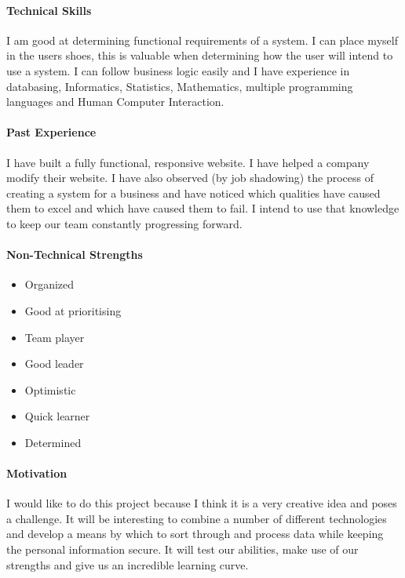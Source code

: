 \documentclass[english]{article}
\begin{document}
			\paragraph{Technical Skills}
			I am good at determining functional requirements of a system. I can place myself in the users shoes, this is valuable when determining how the user will intend to use a system. I can follow business logic easily and I have experience in databasing, Informatics, Statistics, Mathematics, multiple programming languages and Human Computer Interaction.
			
			\paragraph{Past Experience}
			I have built a fully functional, responsive website. I have helped a company modify their website. I have also observed (by job shadowing) the process of creating a system for a business and have noticed which qualities have caused them to excel and which have caused them to fail. I intend to use that knowledge to keep our team constantly progressing forward.
			
			\paragraph{Non-Technical Strengths}
			\begin{itemize}
				\setlength\itemsep{0.2em}
			        \item Organized
			        \item Good at prioritising 
			        \item Team player
			        \item Good leader
			        \item Optimistic
			        \item Quick learner
			        \item Determined
			\end{itemize}
			
			\paragraph{Motivation}
			I would like to do this project because I think it is a very creative idea and poses a challenge. It will be interesting to combine a number of different technologies and develop a means by which to sort through and process data while keeping the personal information secure. It will test our abilities, make use of our strengths and give us an incredible learning curve.
		\newpage
\end{document}
